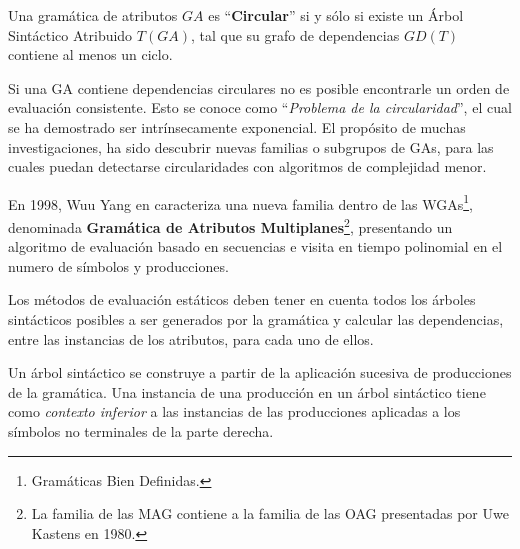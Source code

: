 \documentclass[runningheads,a4paper]{llncs}
\newcommand{\maggen}{\textbf{magGen}}
\begin{document}
Una gramática de atributos $GA$ es ``\textbf{Circular}'' si y sólo si existe un Árbol Sintáctico Atribuido $T(GA)$, tal que su grafo de dependencias $GD(T)$ contiene al menos un ciclo.

Si una GA contiene dependencias circulares no es posible encontrarle un orden de evaluación consistente. Esto se conoce como ``\textit{Problema de la circularidad}'', el cual se ha demostrado ser intrínsecamente exponencial\cite{intri-exc}. El propósito de muchas investigaciones, ha sido descubrir nuevas familias o subgrupos de GAs, para las cuales puedan detectarse circularidades con algoritmos de complejidad menor.


En 1998, Wuu Yang en \cite{wuu-yang1} caracteriza una nueva familia dentro de las WGAs\footnote{Gramáticas Bien Definidas.}, denominada \textbf{Gramática de Atributos Multiplanes}\footnote{La familia de las MAG contiene a la familia de las OAG presentadas por Uwe Kastens\cite{kastens} en 1980.}, presentando un algoritmo de evaluación basado en secuencias e visita en tiempo polinomial en el numero de símbolos y producciones.

Los métodos de evaluación estáticos deben tener en cuenta todos los árboles sintácticos posibles a ser generados por la gramática y calcular las dependencias, entre las instancias de los atributos, para cada uno de ellos. 


Un árbol sintáctico se construye a partir de la aplicación sucesiva de producciones de la gramática. Una instancia de una producción en un árbol sintáctico tiene como \emph{contexto inferior} a las instancias de las producciones aplicadas a los símbolos no terminales de la parte derecha.
\end{document}
